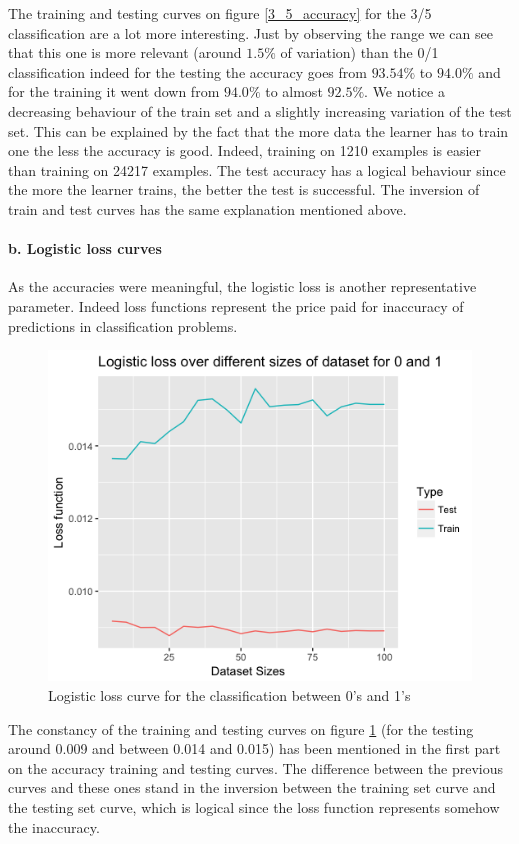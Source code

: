 \documentclass[a4paper,11pt]{article}
\begin{document}
The training and testing curves on figure \ref{3_5_accuracy} for the 3/5 classification are a lot more interesting. Just by observing the range we can see that this one is more relevant (around $1.5\%$ of variation) than the 0/1 classification indeed for the testing the accuracy goes from $93.54\%$ to $94.0\%$ and for the training it went down from $94.0\%$ to almost $92.5\%$. We notice a decreasing behaviour of the train set and a slightly increasing variation of the test set. This can be explained by the fact that the more data the learner has to train one the less the accuracy is good. Indeed, training on 1210 examples is easier than training on 24217 examples. The test accuracy has a logical behaviour since the more the learner trains, the better the test is successful. The inversion of train and test curves has the same explanation mentioned above.

\paragraph*{b. Logistic loss curves}

As the accuracies were meaningful, the logistic loss is another representative parameter. Indeed loss functions represent the price paid for inaccuracy of predictions in classification problems. 

\begin{figure}[H]
\centering
\includegraphics[width=.6\textwidth]{0_1_loss}
\caption{Logistic loss curve for the classification between 0's and 1's}
\label{0_1_loss}
\end{figure}

The constancy of the training and testing curves on figure \ref{0_1_loss} (for the testing around 0.009 and between 0.014 and 0.015) has been mentioned in the first part on the accuracy training and testing curves. The difference between the previous curves and these ones stand in the inversion between the training set curve and the testing set curve, which is logical since the loss function represents somehow the inaccuracy. 
\end{document}
